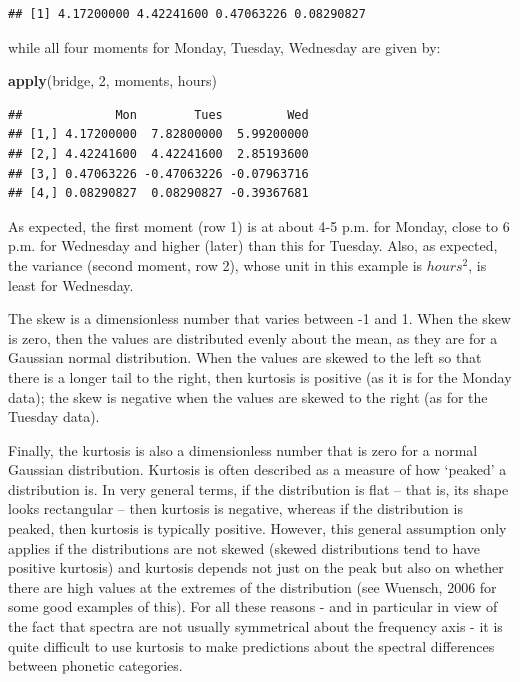 \documentclass[]{book}
\newenvironment{Shaded}{\begin{snugshade}}{\end{snugshade}}
\newcommand{\DecValTok}[1]{\textcolor[rgb]{0.00,0.00,0.81}{#1}}
\newcommand{\KeywordTok}[1]{\textcolor[rgb]{0.13,0.29,0.53}{\textbf{#1}}}
\newcommand{\NormalTok}[1]{#1}
\begin{document}
\begin{verbatim}
## [1] 4.17200000 4.42241600 0.47063226 0.08290827
\end{verbatim}

while all four moments for Monday, Tuesday, Wednesday are given by:

\begin{Shaded}
\begin{Highlighting}[]
\KeywordTok{apply}\NormalTok{(bridge, }\DecValTok{2}\NormalTok{, moments, hours)}
\end{Highlighting}
\end{Shaded}

\begin{verbatim}
##             Mon        Tues         Wed
## [1,] 4.17200000  7.82800000  5.99200000
## [2,] 4.42241600  4.42241600  2.85193600
## [3,] 0.47063226 -0.47063226 -0.07963716
## [4,] 0.08290827  0.08290827 -0.39367681
\end{verbatim}

As expected, the first moment (row 1) is at about 4-5 p.m. for Monday, close to 6 p.m. for Wednesday and higher (later) than this for Tuesday. Also, as expected, the variance (second moment, row 2), whose unit in this example is \(hours^2\), is least for Wednesday.

The skew is a dimensionless number that varies between -1 and 1. When the skew is zero, then the values are distributed evenly about the mean, as they are for a Gaussian normal distribution. When the values are skewed to the left so that there is a longer tail to the right, then kurtosis is positive (as it is for the Monday data); the skew is negative when the values are skewed to the right (as for the Tuesday data).

Finally, the kurtosis is also a dimensionless number that is zero for a normal Gaussian distribution. Kurtosis is often described as a measure of how `peaked' a distribution is. In very general terms, if the distribution is flat -- that is, its shape looks rectangular -- then kurtosis is negative, whereas if the distribution is peaked, then kurtosis is typically positive. However, this general assumption only applies if the distributions are not skewed (skewed distributions tend to have positive kurtosis) and kurtosis depends not just on the peak but also on whether there are high values at the extremes of the distribution (see Wuensch, 2006 for some good examples of this). For all these reasons - and in particular in view of the fact that spectra are not usually symmetrical about the frequency axis - it is quite difficult to use kurtosis to make predictions about the spectral differences between phonetic categories.
\end{document}
